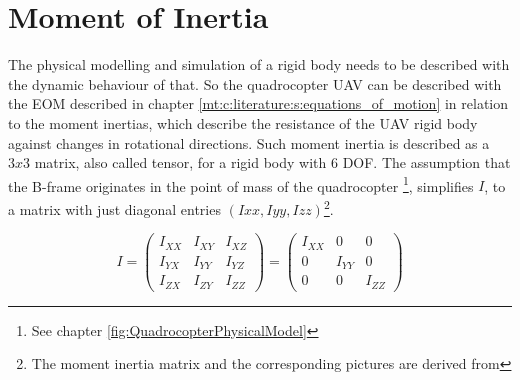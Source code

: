\newpage
\chapter{Moment of Inertia}
\label{mt:c:Appendix}
\label{mt:c:Appendix:s:Moment of inertia}

The physical modelling and simulation of a rigid body needs to be described with
the dynamic behaviour of that. So the quadrocopter \gls{UAV} can be described with the
\gls{EOM} described in chapter \ref{mt:c:literature:s:equations_of_motion} in
relation to the moment inertias, which describe the resistance of the \gls{UAV} rigid body against changes in rotational
directions. Such moment inertia is described as a \ensuremath{3x3} matrix, also
called tensor, for a rigid body with 6 \gls{DOF}. The assumption that the B-frame originates in the
point of mass of the quadrocopter \footnote{See chapter
\ref{fig:QuadrocopterPhysicalModel}},
 simplifies \ensuremath{I}, to a matrix with just diagonal entries \ensuremath{(Ixx,
 Iyy, Izz)}\footnote{The moment inertia matrix and the
 corresponding pictures are derived from }.

\begin{equation}
\label{formula:InertiaMatrix}
I=\begin{pmatrix} I_{XX} & I_{XY} & I_{XZ} \\ I_{YX} & I_{YY} & I_{YZ} \\ I_{ZX}
& I_{ZY} & I_{ZZ} \end{pmatrix} =  
\begin{pmatrix} I_{XX} & 0 & 0 \\ 0 & I_{YY} & 0 \\ 0 & 0 & I_{ZZ} \end{pmatrix}
\end{equation} 

% 
% 
% 
% 
% 
% 


